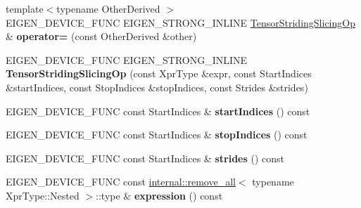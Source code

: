 \begin{DoxyCompactItemize}
\item 
\mbox{\label{class_eigen_1_1_tensor_striding_slicing_op_ab354f475443d80eef3c90a6656cfacd0}} 
{\footnotesize template$<$typename Other\+Derived $>$ }\\E\+I\+G\+E\+N\+\_\+\+D\+E\+V\+I\+C\+E\+\_\+\+F\+U\+NC E\+I\+G\+E\+N\+\_\+\+S\+T\+R\+O\+N\+G\+\_\+\+I\+N\+L\+I\+NE \hyperlink{class_eigen_1_1_tensor_striding_slicing_op}{Tensor\+Striding\+Slicing\+Op} \& {\bfseries operator=} (const Other\+Derived \&other)
\item 
\mbox{\label{class_eigen_1_1_tensor_striding_slicing_op_ac836b4447e4fedf39e756dd9cefe8bdd}} 
E\+I\+G\+E\+N\+\_\+\+D\+E\+V\+I\+C\+E\+\_\+\+F\+U\+NC E\+I\+G\+E\+N\+\_\+\+S\+T\+R\+O\+N\+G\+\_\+\+I\+N\+L\+I\+NE {\bfseries Tensor\+Striding\+Slicing\+Op} (const Xpr\+Type \&expr, const Start\+Indices \&start\+Indices, const Stop\+Indices \&stop\+Indices, const Strides \&strides)
\item 
\mbox{\label{class_eigen_1_1_tensor_striding_slicing_op_a984d140ea7bf1909f7da9ae320aa2576}} 
E\+I\+G\+E\+N\+\_\+\+D\+E\+V\+I\+C\+E\+\_\+\+F\+U\+NC const Start\+Indices \& {\bfseries start\+Indices} () const
\item 
\mbox{\label{class_eigen_1_1_tensor_striding_slicing_op_a924cbb7e2e3082175d16ec2a94a149ce}} 
E\+I\+G\+E\+N\+\_\+\+D\+E\+V\+I\+C\+E\+\_\+\+F\+U\+NC const Start\+Indices \& {\bfseries stop\+Indices} () const
\item 
\mbox{\label{class_eigen_1_1_tensor_striding_slicing_op_a1559e33db3abc3b24b45def06a8954f5}} 
E\+I\+G\+E\+N\+\_\+\+D\+E\+V\+I\+C\+E\+\_\+\+F\+U\+NC const Start\+Indices \& {\bfseries strides} () const
\item 
\mbox{\label{class_eigen_1_1_tensor_striding_slicing_op_a0f55b9c6f1e5ba68a10c69dd5d3fb808}} 
E\+I\+G\+E\+N\+\_\+\+D\+E\+V\+I\+C\+E\+\_\+\+F\+U\+NC const \hyperlink{struct_eigen_1_1internal_1_1remove__all}{internal\+::remove\+\_\+all}$<$ typename Xpr\+Type\+::\+Nested $>$\+::type \& {\bfseries expression} () const
\item 

\end{DoxyCompactItemize}

